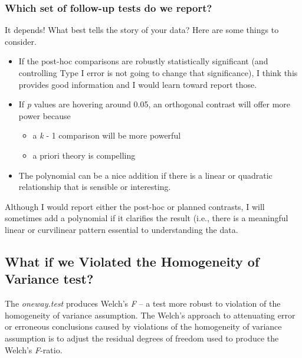 \documentclass[
  english,
]{book}
\providecommand{\tightlist}{%
  \setlength{\itemsep}{0pt}\setlength{\parskip}{0pt}}
\begin{document}
\hypertarget{which-set-of-follow-up-tests-do-we-report}{%
\subsubsection{Which set of follow-up tests do we report?}\label{which-set-of-follow-up-tests-do-we-report}}

It depends! What best tells the story of your data? Here are some things to consider.

\begin{itemize}
\tightlist
\item
  If the post-hoc comparisons are robustly statistically significant (and controlling Type I error is not going to change that significance), I think this provides good information and I would learn toward report those.
\item
  If \emph{p} values are hovering around 0.05, an orthogonal contrast will offer more power because

  \begin{itemize}
  \tightlist
  \item
    a \emph{k} - 1 comparison will be more powerful
  \item
    a priori theory is compelling
  \end{itemize}
\item
  The polynomial can be a nice addition if there is a linear or quadratic relationship that is sensible or interesting.
\end{itemize}

Although I would report either the post-hoc or planned contrasts, I will sometimes add a polynomial if it clarifies the result (i.e., there is a meaningful linear or curvilinear pattern essential to understanding the data.

\hypertarget{what-if-we-violated-the-homogeneity-of-variance-test}{%
\subsection{What if we Violated the Homogeneity of Variance test?}\label{what-if-we-violated-the-homogeneity-of-variance-test}}

The \emph{oneway.test} produces Welch's \emph{F} -- a test more robust to violation of the homogeneity of variance assumption. The Welch's approach to attenuating error or erroneous conclusions caused by violations of the homogeneity of variance assumption is to adjust the residual degrees of freedom used to produce the Welch's \emph{F}-ratio.
\end{document}

